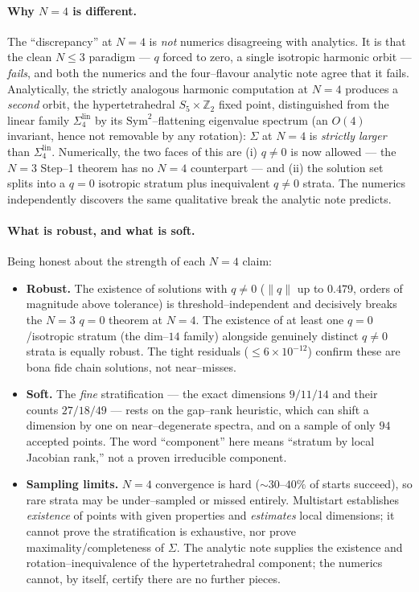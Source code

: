 \documentclass[11pt]{article}
\newcommand{\Sym}{\mathrm{Sym}}
\newcommand{\norm}[1]{\lVert #1\rVert}
\begin{document}
\paragraph{Why $N=4$ is different.}
The ``discrepancy'' at $N=4$ is \emph{not} numerics disagreeing with analytics.
It is that the clean $N\le3$ paradigm --- $q$ forced to zero, a single isotropic
harmonic orbit --- \emph{fails}, and both the numerics and the four--flavour
analytic note agree that it fails. Analytically, the strictly analogous
harmonic computation at $N=4$ produces a \emph{second} orbit, the
hypertetrahedral $S_5\times\mathbb Z_2$ fixed point, distinguished from the
linear family $\Sigma^{\mathrm{lin}}_4$ by its $\Sym^2$--flattening eigenvalue
spectrum (an $O(4)$ invariant, hence not removable by any rotation): $\Sigma$ at
$N=4$ is \emph{strictly larger} than $\Sigma^{\mathrm{lin}}_4$. Numerically, the
two faces of this are (i) $q\neq0$ is now allowed --- the $N=3$ Step--1 theorem
has no $N=4$ counterpart --- and (ii) the solution set splits into a $q=0$
isotropic stratum plus inequivalent $q\neq0$ strata. The numerics independently
discovers the same qualitative break the analytic note predicts.

\paragraph{What is robust, and what is soft.}
Being honest about the strength of each $N=4$ claim:
\begin{itemize}
\item \textbf{Robust.} The existence of solutions with $q\neq0$ ($\norm q$ up to
$0.479$, orders of magnitude above tolerance) is threshold--independent and
decisively breaks the $N=3$ $q=0$ theorem at $N=4$. The existence of at least
one $q=0$/isotropic stratum (the dim--$14$ family) alongside genuinely distinct
$q\neq0$ strata is equally robust. The tight residuals ($\le6\times10^{-12}$)
confirm these are bona fide chain solutions, not near--misses.
\item \textbf{Soft.} The \emph{fine} stratification --- the exact dimensions
$9/11/14$ and their counts $27/18/49$ --- rests on the gap--rank heuristic,
which can shift a dimension by one on near--degenerate spectra, and on a sample
of only $94$ accepted points. The word ``component'' here means ``stratum by
local Jacobian rank,'' not a proven irreducible component.
\item \textbf{Sampling limits.} $N=4$ convergence is hard
($\sim30\text{--}40\%$ of starts succeed), so rare strata may be
under--sampled or missed entirely. Multistart establishes \emph{existence} of
points with given properties and \emph{estimates} local dimensions; it cannot
prove the stratification is exhaustive, nor prove maximality/completeness of
$\Sigma$. The analytic note supplies the existence and rotation--inequivalence
of the hypertetrahedral component; the numerics cannot, by itself, certify
there are no further pieces.
\end{itemize}
\end{document}
